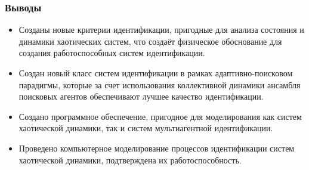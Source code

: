 \documentclass[10pt,utf8]{beamer}
\begin{document}
\begin{frame}
  \frametitle{Выводы}

  \begin{itemize}

    \item
      Созданы новые критерии идентификации,
      пригодные для анализа состояния и динамики хаотических систем, что создаёт
      физическое  обоснование для создания работоспособных систем идентификации.

    \item
      Создан новый класс систем идентификации в рамках адаптивно-поисковом парадигмы,
      которые за счет использования коллективной динамики ансамбля поисковых
      агентов обеспечивают лучшее качество идентификации.

    \item
      Создано программное обеспечение, пригодное для моделирования как систем
      хаотической динамики, так и систем мультиагентной идентификации.

    \item
      Проведено компьютерное моделирование процессов идентификации систем хаотической
      динамики, подтверждена их работоспособность.

  \end{itemize}


\end{frame}



%
%
%
\end{document}
